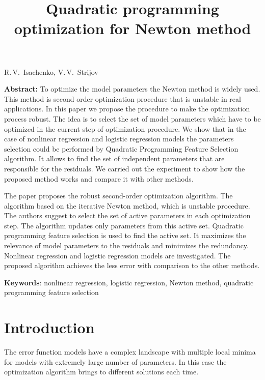 \documentclass[a4paper,12pt]{article}
\theoremstyle{plain} %
\theoremstyle{definition} %
\theoremstyle{remark} %
\begin{document}
		
		\title
	{Quadratic programming optimization for Newton method}
	\date{}
	\maketitle
	\begin{center}
		R.\,V.~Isachenko,
		V.\,V.~Strijov
	\end{center}
	\textbf{Abstract:} 
	To optimize the model parameters the Newton method is widely used. 
	This method is second order optimization procedure that is unstable in real applications. 
	In this paper we propose the procedure to make the optimization process robust. 
	The idea is to select the set of model parameters which have to be optimized in the current step of optimization procedure.
	We show that in the case of nonlinear regression and logistic regression models the parameters selection could be performed by Quadratic Programming Feature Selection algorithm.
	It allows to find the set of independent parameters that are responsible for the residuals.
	We carried out the experiment to show how the proposed method works and compare it with other methods.
	
	The paper proposes the robust second-order optimization algorithm.
	The algorithm based on the iterative Newton method, which is unstable procedure.
	The authors suggest to select the set of active parameters in each optimization step.    The algorithm updates only parameters from this active set. 
	Quadratic programming feature selection is used to find the active set. It maximizes the relevance of model parameters to the residuals and minimizes the redundancy. Nonlinear regression and logistic regression models are investigated. 
	The proposed algorithm achieves the less error with comparison to the other methods.
	
	\bigskip
	\textbf{Keywords}: nonlinear regression, logistic regression, Newton method, quadratic programming feature selection
	
	\section*{Introduction}
	The error function models have a complex landscape with multiple local minima for models with extremely large number of parameters. 
	In this case the optimization algorithm brings to different solutions each time.
	
\end{document}
